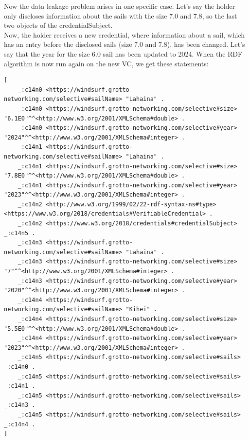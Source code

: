 \documentclass[
	a4paper               %
	,BCOR=0mm            %
	,bibliography=totoc   %
	,listof=totoc         %
	,monolingual
	,twoside=false
]{bfhthesis}              %
\begin{document}
Now the data leakage problem arises in one specific case.
Let's say the holder only discloses information about the sails with the size 7.0 and 7.8, so the last two objects of the credentialSubject.\\
Now, the holder receives a new credential, where information about a sail, which has an entry before the disclosed sails (size 7.0 and 7.8), has been changed.
Let's say that the year for the size 6.0 sail has been updated to 2024.
When the RDF algorithm is now run again on the new VC, we get these statements:

\begin{lstlisting}[language=canon,firstnumber=1,caption={Example: Updated sails VC as statements},captionpos=b]
[
	_:c14n0 <https://windsurf.grotto-networking.com/selective#sailName> "Lahaina" .
	_:c14n0 <https://windsurf.grotto-networking.com/selective#size> "6.1E0"^^<http://www.w3.org/2001/XMLSchema#double> .
	_:c14n0 <https://windsurf.grotto-networking.com/selective#year> "2024"^^<http://www.w3.org/2001/XMLSchema#integer> .
	_:c14n1 <https://windsurf.grotto-networking.com/selective#sailName> "Lahaina" .
	_:c14n1 <https://windsurf.grotto-networking.com/selective#size> "7.8E0"^^<http://www.w3.org/2001/XMLSchema#double> .
	_:c14n1 <https://windsurf.grotto-networking.com/selective#year> "2023"^^<http://www.w3.org/2001/XMLSchema#integer> .
	_:c14n2 <http://www.w3.org/1999/02/22-rdf-syntax-ns#type> <https://www.w3.org/2018/credentials#VerifiableCredential> .
	_:c14n2 <https://www.w3.org/2018/credentials#credentialSubject> _:c14n5 .
	_:c14n3 <https://windsurf.grotto-networking.com/selective#sailName> "Lahaina" .
	_:c14n3 <https://windsurf.grotto-networking.com/selective#size> "7"^^<http://www.w3.org/2001/XMLSchema#integer> .
	_:c14n3 <https://windsurf.grotto-networking.com/selective#year> "2020"^^<http://www.w3.org/2001/XMLSchema#integer> .
	_:c14n4 <https://windsurf.grotto-networking.com/selective#sailName> "Kihei" .
	_:c14n4 <https://windsurf.grotto-networking.com/selective#size> "5.5E0"^^<http://www.w3.org/2001/XMLSchema#double> .
	_:c14n4 <https://windsurf.grotto-networking.com/selective#year> "2023"^^<http://www.w3.org/2001/XMLSchema#integer> .
	_:c14n5 <https://windsurf.grotto-networking.com/selective#sails> _:c14n0 .
	_:c14n5 <https://windsurf.grotto-networking.com/selective#sails> _:c14n1 .
	_:c14n5 <https://windsurf.grotto-networking.com/selective#sails> _:c14n3 .
	_:c14n5 <https://windsurf.grotto-networking.com/selective#sails> _:c14n4 .
]
\end{lstlisting}
\end{document}

